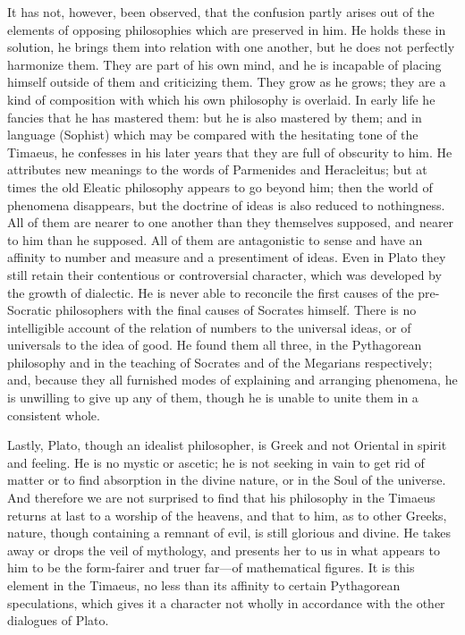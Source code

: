 It has not, however, been observed, that the confusion partly arises out
of the elements of opposing philosophies which are preserved in him. He
holds these in solution, he brings them into relation with one another,
but he does not perfectly harmonize them. They are part of his own mind,
and he is incapable of placing himself outside of them and criticizing
them. They grow as he grows; they are a kind of composition with which his
own philosophy is overlaid. In early life he fancies that he has mastered
them: but he is also mastered by them; and in language (Sophist) which may
be compared with the hesitating tone of the Timaeus, he confesses in his
later years that they are full of obscurity to him. He attributes new
meanings to the words of Parmenides and Heracleitus; but at times the old
Eleatic philosophy appears to go beyond him; then the world of phenomena
disappears, but the doctrine of ideas is also reduced to nothingness. All
of them are nearer to one another than they themselves supposed, and
nearer to him than he supposed. All of them are antagonistic to sense and
have an affinity to number and measure and a presentiment of ideas. Even
in Plato they still retain their contentious or controversial character,
which was developed by the growth of dialectic. He is never able to
reconcile the first causes of the pre-Socratic philosophers with the final
causes of Socrates himself. There is no intelligible account of the
relation of numbers to the universal ideas, or of universals to the idea
of good. He found them all three, in the Pythagorean philosophy and in the
teaching of Socrates and of the Megarians respectively; and, because they
all furnished modes of explaining and arranging phenomena, he is unwilling
to give up any of them, though he is unable to unite them in a consistent
whole.

Lastly, Plato, though an idealist philosopher, is Greek and not Oriental
in spirit and feeling. He is no mystic or ascetic; he is not seeking in
vain to get rid of matter or to find absorption in the divine nature, or
in the Soul of the universe. And therefore we are not surprised to find
that his philosophy in the Timaeus returns at last to a worship of the
heavens, and that to him, as to other Greeks, nature, though containing a
remnant of evil, is still glorious and divine. He takes away or drops the
veil of mythology, and presents her to us in what appears to him to be the
form-fairer and truer far—of mathematical figures. It is this
element in the Timaeus, no less than its affinity to certain Pythagorean
speculations, which gives it a character not wholly in accordance with the
other dialogues of Plato.

